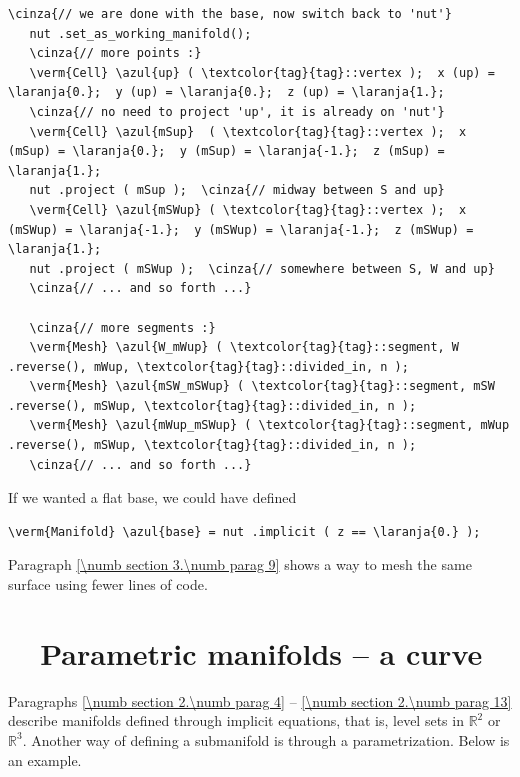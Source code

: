 \begin{Verbatim}[commandchars=\\\{\},formatcom=\small\tt,frame=single,
   label=parag-\ref{\numb section 2.\numb parag 13}.cpp,rulecolor=\color{coment},
   baselinestretch=0.94,framesep=2mm]
   \cinza{// we are done with the base, now switch back to 'nut'}
   nut .set_as_working_manifold();
   \cinza{// more points :}
   \verm{Cell} \azul{up} ( \textcolor{tag}{tag}::vertex );  x (up) = \laranja{0.};  y (up) = \laranja{0.};  z (up) = \laranja{1.};
   \cinza{// no need to project 'up', it is already on 'nut'}
   \verm{Cell} \azul{mSup}  ( \textcolor{tag}{tag}::vertex );  x (mSup) = \laranja{0.};  y (mSup) = \laranja{-1.};  z (mSup) = \laranja{1.};
   nut .project ( mSup );  \cinza{// midway between S and up}
   \verm{Cell} \azul{mSWup} ( \textcolor{tag}{tag}::vertex );  x (mSWup) = \laranja{-1.};  y (mSWup) = \laranja{-1.};  z (mSWup) = \laranja{1.};
   nut .project ( mSWup );  \cinza{// somewhere between S, W and up}
   \cinza{// ... and so forth ...}

   \cinza{// more segments :}
   \verm{Mesh} \azul{W_mWup} ( \textcolor{tag}{tag}::segment, W .reverse(), mWup, \textcolor{tag}{tag}::divided_in, n );
   \verm{Mesh} \azul{mSW_mSWup} ( \textcolor{tag}{tag}::segment, mSW .reverse(), mSWup, \textcolor{tag}{tag}::divided_in, n );
   \verm{Mesh} \azul{mWup_mSWup} ( \textcolor{tag}{tag}::segment, mWup .reverse(), mSWup, \textcolor{tag}{tag}::divided_in, n );
   \cinza{// ... and so forth ...}
\end{Verbatim}

If we wanted a flat base, we could have defined

\begin{Verbatim}[commandchars=\\\{\},formatcom=\small\tt,baselinestretch=0.94]
   \verm{Manifold} \azul{base} = nut .implicit ( z == \laranja{0.} );
\end{Verbatim}

Paragraph \ref{\numb section 3.\numb parag 9} shows a way to mesh the same surface using
fewer lines of code.


\section{~~Parametric manifolds -- a curve}\label{\numb section 2.\numb parag 14}

Paragraphs \ref{\numb section 2.\numb parag 4} -- \ref{\numb section 2.\numb parag 13} describe
manifolds defined through implicit equations, that is, level sets in $ \mathbb{R}^2 $ or
$ \mathbb{R}^3 $.
Another way of defining a submanifold is through a parametrization.
Below is an example.

